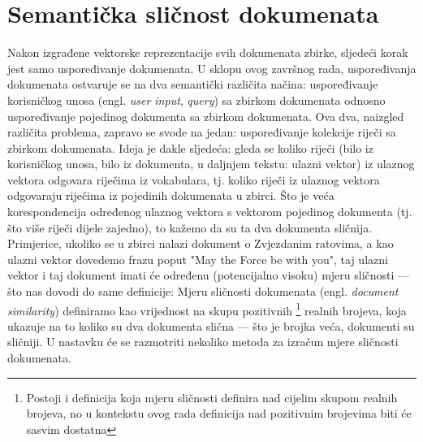 \documentclass[times, utf8, zavrsni]{fer}
\begin{document}
\section{Semantička sličnost dokumenata}
\label{subchap:similarity}
Nakon izgrađene vektorske reprezentacije svih dokumenata zbirke, sljedeći korak jest samo uspoređivanje dokumenata. U sklopu ovog završnog rada, uspoređivanja dokumenata ostvaruje se na dva semantički različita načina: uspoređivanje korisničkog unosa (engl. \textit{user input}, \textit{query}) sa zbirkom dokumenata odnosno uspoređivanje pojedinog dokumenta sa zbirkom dokumenata.
Ova dva, naizgled različita problema, zapravo se svode na jedan: uspoređivanje kolekcije riječi sa zbirkom dokumenata. Ideja je dakle sljedeća: gleda se koliko riječi (bilo iz korisničkog unosa, bilo iz dokumenta, u daljnjem tekstu: ulazni vektor) iz ulaznog vektora odgovara riječima iz vokabulara, tj. koliko riječi iz ulaznog vektora odgovaraju riječima iz pojedinih dokumenata u zbirci. Što je veća korespondencija određenog ulaznog vektora s vektorom pojedinog dokumenta (tj. što više riječi dijele zajedno), to kažemo da su ta dva dokumenta sličnija. Primjerice, ukoliko se u zbirci nalazi dokument o Zvjezdanim ratovima, a kao ulazni vektor dovedemo frazu poput "May the Force be with you", taj ulazni vektor i taj dokument imati će određenu (potencijalno visoku) mjeru sličnosti — što nas dovodi do same definicije:
\newline
Mjeru sličnosti dokumenata (engl. \textit{document similarity}) definiramo kao vrijednost na skupu pozitivnih \footnote{Postoji i definicija koja mjeru sličnosti definira nad cijelim skupom realnih brojeva, no u kontekstu ovog rada definicija nad pozitivnim brojevima biti će sasvim dostatna} realnih brojeva, koja ukazuje na to koliko su dva dokumenta slična — što je brojka veća, dokumenti su sličniji.
U nastavku će se razmotriti nekoliko metoda za izračun mjere sličnosti dokumenata.
\end{document}
